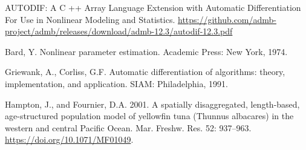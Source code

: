 


\begin{thebibliography}{999}

 AUTODIF: A C ++ Array Language Extension with Automatic Differentiation For Use in Nonlinear Modeling and Statistics. \url{https://github.com/admb-project/admb/releases/download/admb-12.3/autodif-12.3.pdf} 

Bard, Y. Nonlinear parameter estimation. Academic Press: New York, 1974.

Griewank, A.,  Corliss, G.F.  Automatic differentiation of algorithms: theory, implementation, and application. SIAM: Philadelphia, 1991.

Hampton, J., and Fournier, D.A. 2001. A spatially disaggregated, length-based, age-structured population model of yellowfin tuna (Thunnus albacares) in the western and central Pacific Ocean. Mar. Freshw. Res. 52: 937–963. \url{https://doi.org/10.1071/MF01049}.


\end{thebibliography}
